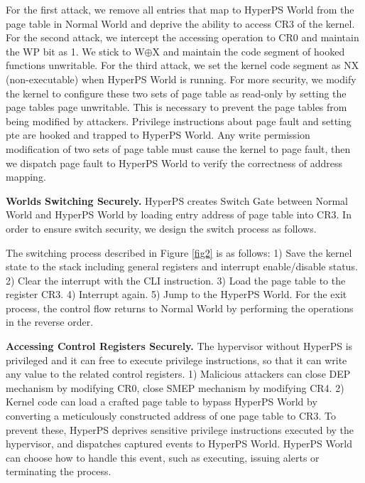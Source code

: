 ﻿\documentclass[conference]{IEEEtran}
\begin{document}
For the first attack, %
we remove all entries that map to HyperPS World from the page table in Normal World and deprive the ability to access CR3 of the kernel. %
For the second attack, we intercept the accessing operation to CR0 and maintain the WP bit as 1. We stick to W$\oplus${X} and maintain the code segment of hooked functions unwritable.
For the third attack, we set the kernel code segment as NX (non-executable) when HyperPS World is running. For more security, we modify the kernel to configure these two sets of page table as read-only by setting the page tables page unwritable. This is necessary to prevent the page tables from being modified by attackers. Privilege instructions about page fault and setting pte are hooked and trapped to HyperPS World. Any write permission modification of two sets of page table must cause the kernel to page fault, then we dispatch page fault to HyperPS World to verify the correctness of address mapping. 


\textbf{Worlds Switching Securely.}
HyperPS creates Switch Gate between Normal World and HyperPS World by loading entry address of page table into CR3.
In order to ensure switch security, we design the switch process as follows.

The switching process described in Figure \ref{fig2} is as follows: 1) Save the kernel state to the stack including general registers and interrupt enable/disable status. 2) Clear the interrupt with the CLI instruction. 3) Load the page table to the register CR3. 4) Interrupt again. 5) Jump to the HyperPS World. For the exit process, the control flow returns to Normal World by performing the operations in the reverse order.


\textbf{Accessing Control Registers Securely.}
The hypervisor without HyperPS is privileged and it can free to execute privilege instructions, so that it can write any value to the related control registers. 1) Malicious attackers can close DEP mechanism by modifying CR0, close SMEP mechanism by modifying CR4. 2) Kernel code can load a crafted page table to bypass HyperPS World by converting a meticulously constructed address of one page table to CR3.
To prevent these, HyperPS deprives sensitive privilege instructions executed by the hypervisor, and dispatches captured events to HyperPS World. HyperPS World can choose how to handle this event, such as executing, issuing alerts or terminating the process. 
\end{document}

